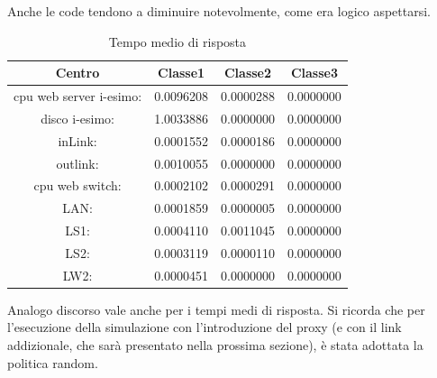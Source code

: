 Anche le code tendono a diminuire notevolmente, come era logico aspettarsi. 
\begin{table}[htbp]
\begin{center}
\begin{tabular}{||c|c|c|c||}
\hline
Centro &Classe1 &Classe2 &Classe3\\
\hline
\hline
 cpu web server i-esimo: 	&0.0096208	&0.0000288	&0.0000000\\
\hline
 disco i-esimo: 	&1.0033886	&0.0000000	&0.0000000\\
\hline
 inLink: 	&0.0001552	&0.0000186	&0.0000000\\
\hline
 outlink: 	&0.0010055	&0.0000000	&0.0000000\\
\hline
 cpu web switch: 	&0.0002102	&0.0000291	&0.0000000\\
\hline
 LAN: 	&0.0001859	&0.0000005	&0.0000000\\
\hline
 LS1: 	&0.0004110	&0.0011045	&0.0000000\\
\hline
 LS2: 	&0.0003119	&0.0000110	&0.0000000\\
\hline
 LW2: 	&0.0000451	&0.0000000	&0.0000000\\
\hline
\end{tabular}
\end{center}
\caption{Tempo medio di risposta}
\label{tempomediodirisposta}
\end{table}
Analogo discorso vale anche per i tempi medi di risposta. Si ricorda che per l'esecuzione della simulazione con l'introduzione del proxy (e con il link addizionale, che sarà presentato nella prossima  sezione), è stata adottata la politica random.

